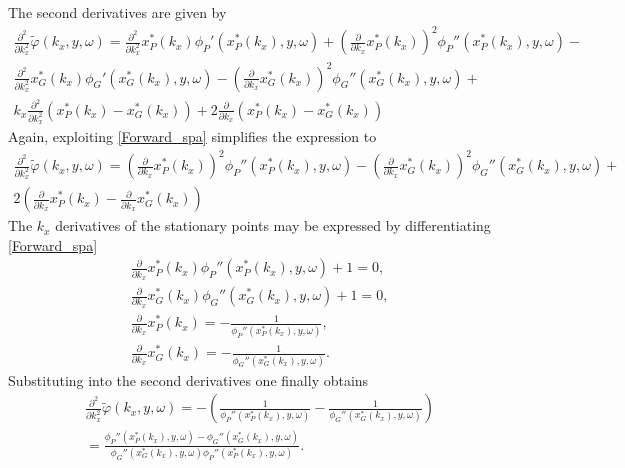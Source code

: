 \documentclass[12pt,a4paper]{article}
\begin{document}
The second derivatives are given by 
\begin{multline}
\frac{\partial^2}{\partial k_x^2}\tilde{\varphi}(k_x,y,\omega) =
\frac{\partial^2}{\partial k_x^2}x_P^*(k_x) \phi_P'(x_P^*(k_x),y,\omega)+
\left( \frac{\partial}{\partial k_x}x_P^*(k_x) \right)^2 \phi_P''(x_P^*(k_x),y,\omega) 
 - 	\\
\frac{\partial^2}{\partial k_x^2}x_G^*(k_x) \phi_G'(x_G^*(k_x),y,\omega)-
\left( \frac{\partial}{\partial k_x}x_G^*(k_x) \right)^2 \phi_G''(x_G^*(k_x),y,\omega) +\\
k_x \frac{\partial^2}{\partial k_x^2}\left( x_P^*(k_x) - x_G^*(k_x) \right)+
2 \frac{\partial}{\partial k_x}\left( x_P^*(k_x) - x_G^*(k_x) \right) 
\end{multline}
Again, exploiting \eqref{Forward_spa} simplifies the expression to
\begin{multline}
\frac{\partial^2}{\partial k_x^2}\tilde{\varphi}(k_x,y,\omega) =
\left( \frac{\partial}{\partial k_x}x_P^*(k_x) \right)^2 \phi_P''(x_P^*(k_x),y,\omega) 
 - 
\left( \frac{\partial}{\partial k_x}x_G^*(k_x) \right)^2 \phi_G''(x_G^*(k_x),y,\omega) +\\
2\left(  \frac{\partial}{\partial k_x} x_P^*(k_x) -  \frac{\partial}{\partial k_x} x_G^*(k_x) \right) 
\end{multline}
The $k_x$ derivatives of the stationary points may be  expressed by differentiating \eqref{Forward_spa}
\begin{eqnarray}
\frac{\partial}{\partial k_x} x_P^*(k_x)\phi_P''(x_P^*(k_x),y,\omega) + 1 = 0,\\
\frac{\partial}{\partial k_x} x_G^*(k_x)\phi_G''(x_G^*(k_x),y,\omega) + 1 = 0,\\
\frac{\partial}{\partial k_x} x_P^*(k_x) = -\frac{1}{\phi_P''(x_P^*(k_x),y,\omega)},\\
\frac{\partial}{\partial k_x} x_G^*(k_x) = -\frac{1}{\phi_G''(x_G^*(k_x),y,\omega)}.
\end{eqnarray}
Substituting into the second derivatives one finally obtains
\begin{multline}
\frac{\partial^2}{\partial k_x^2}\tilde{\varphi}(k_x,y,\omega) =
 - \left( \frac{1}{\phi_P''(x_P^*(k_x),y,\omega)} - \frac{1}{\phi_G''(x_G^*(k_x),y,\omega)} \right) 
\\ =
 \frac{\phi_P''(x_P^*(k_x),y,\omega) - \phi_G''(x_G^*(k_x),y,\omega)}{\phi_G''(x_G^*(k_x),y,\omega) \phi_P''(x_P^*(k_x),y,\omega)}.
\end{multline}
\end{document}
